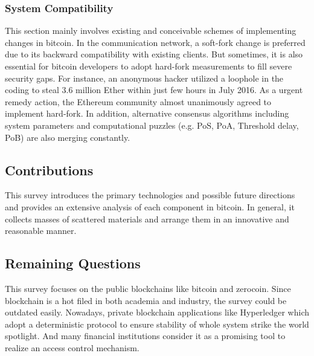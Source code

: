 \documentclass[conference]{IEEEtran}
\begin{document}
\subsubsection{System Compatibility}
This section mainly involves existing and conceivable schemes of implementing changes in bitcoin.
%
In the communication network, a soft-fork change is preferred due to its backward compatibility with existing clients.
%
But sometimes, it is also essential for bitcoin developers to adopt hard-fork measurements to fill severe security gaps.
%
For instance, an anonymous hacker utilized a loophole in the coding to steal 3.6 million Ether within just few hours in July 2016. 
%
As a urgent remedy action, the Ethereum community almost unanimously agreed to implement hard-fork. 
%
In addition, alternative consensus algorithms including system parameters and computational puzzles (e.g. PoS\cite{king2012ppcoin}, PoA\cite{gunnam2008next}, Threshold delay\cite{Dfinity}, PoB\cite{Slimcoin}) are also merging constantly.  


\subsection{Contributions}
This survey introduces the primary technologies and possible future directions and provides an extensive analysis of each component in bitcoin. 
%
In general, it collects masses of scattered materials and arrange them in an innovative and reasonable manner. 

\subsection{Remaining Questions}
This survey focuses on the public blockchains like bitcoin and zerocoin. 
%
Since blockchain is a hot filed in both academia and industry, the survey could be outdated easily.
%
Nowadays, private blockchain applications like Hyperledger\cite{androulaki2018hyperledger} which adopt a deterministic protocol to ensure stability of whole system strike the world spotlight.
%
And many financial institutions consider it as a promising tool to realize an access control mechanism.




\end{document}
